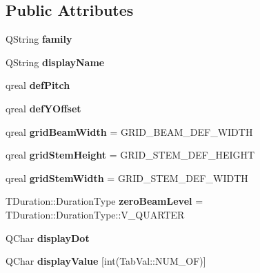 \subsection*{Public Attributes}
\begin{DoxyCompactItemize}
\item 
\mbox{\label{struct_ms_1_1_tablature_duration_font_a1e9b44a4a4f8f35833d958f4cb77eee5}} 
Q\+String {\bfseries family}
\item 
\mbox{\label{struct_ms_1_1_tablature_duration_font_ac2ba144da4217a69c7812eaf6dacc1d8}} 
Q\+String {\bfseries display\+Name}
\item 
\mbox{\label{struct_ms_1_1_tablature_duration_font_a9678c1ff8fd385bbb3ab896db2748e06}} 
qreal {\bfseries def\+Pitch}
\item 
\mbox{\label{struct_ms_1_1_tablature_duration_font_aa7b8d8141ce27731a02e07097b7e9e5b}} 
qreal {\bfseries def\+Y\+Offset}
\item 
\mbox{\label{struct_ms_1_1_tablature_duration_font_a8d7a3860b387ee137919165a7d6b9c14}} 
qreal {\bfseries grid\+Beam\+Width} = G\+R\+I\+D\+\_\+\+B\+E\+A\+M\+\_\+\+D\+E\+F\+\_\+\+W\+I\+D\+TH
\item 
\mbox{\label{struct_ms_1_1_tablature_duration_font_acfcb2ad0c714267baef53bac90cfb8b3}} 
qreal {\bfseries grid\+Stem\+Height} = G\+R\+I\+D\+\_\+\+S\+T\+E\+M\+\_\+\+D\+E\+F\+\_\+\+H\+E\+I\+G\+HT
\item 
\mbox{\label{struct_ms_1_1_tablature_duration_font_aca3d6c807fd4500d1ea8e314ffe1df5e}} 
qreal {\bfseries grid\+Stem\+Width} = G\+R\+I\+D\+\_\+\+S\+T\+E\+M\+\_\+\+D\+E\+F\+\_\+\+W\+I\+D\+TH
\item 
\mbox{\label{struct_ms_1_1_tablature_duration_font_a60c43990e4706481e84c1cf2bca51c85}} 
T\+Duration\+::\+Duration\+Type {\bfseries zero\+Beam\+Level} = T\+Duration\+::\+Duration\+Type\+::\+V\+\_\+\+Q\+U\+A\+R\+T\+ER
\item 
\mbox{\label{struct_ms_1_1_tablature_duration_font_a6f9852c8a5dd897a1f4300a2d65896a4}} 
Q\+Char {\bfseries display\+Dot}
\item 
\mbox{\label{struct_ms_1_1_tablature_duration_font_aabe52c0fabc0ef7a56ce6d2459c6d0a5}} 
Q\+Char {\bfseries display\+Value} \mbox{[}int(Tab\+Val\+::\+N\+U\+M\+\_\+\+OF)\mbox{]}
\end{DoxyCompactItemize}


